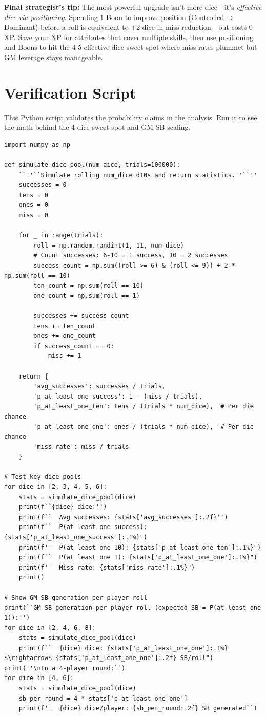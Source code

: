 \documentclass[11pt]{article}
\begin{document}
\textbf{Final strategist's tip:} 
The most powerful upgrade isn't more dice---it's \textit{effective dice via positioning}. Spending 1 Boon to improve position (Controlled$\rightarrow$Dominant) before a roll is equivalent to +2 dice in miss reduction---but costs 0 XP. Save your XP for attributes that cover multiple skills, then use positioning and Boons to hit the 4-5 effective dice sweet spot where miss rates plummet but GM leverage stays manageable.

\appendix
\section{Verification Script}
This Python script validates the probability claims in the analysis. Run it to see the math behind the 4-dice sweet spot and GM SB scaling.

\begin{lstlisting}
import numpy as np

def simulate_dice_pool(num_dice, trials=100000):
    ``''``Simulate rolling num_dice d10s and return statistics.''``''
    successes = 0
    tens = 0
    ones = 0
    miss = 0
    
    for _ in range(trials):
        roll = np.random.randint(1, 11, num_dice)
        # Count successes: 6-10 = 1 success, 10 = 2 successes
        success_count = np.sum((roll >= 6) & (roll <= 9)) + 2 * np.sum(roll == 10)
        ten_count = np.sum(roll == 10)
        one_count = np.sum(roll == 1)
        
        successes += success_count
        tens += ten_count
        ones += one_count
        if success_count == 0:
            miss += 1
    
    return {
        'avg_successes': successes / trials,
        'p_at_least_one_success': 1 - (miss / trials),
        'p_at_least_one_ten': tens / (trials * num_dice),  # Per die chance
        'p_at_least_one_one': ones / (trials * num_dice),  # Per die chance
        'miss_rate': miss / trials
    }

# Test key dice pools
for dice in [2, 3, 4, 5, 6]:
    stats = simulate_dice_pool(dice)
    print(f``{dice} dice:'')
    print(f``  Avg successes: {stats['avg_successes']:.2f}'')
    print(f``  P(at least one success): {stats['p_at_least_one_success']:.1%}")
    print(f''  P(at least one 10): {stats['p_at_least_one_ten']:.1%}")
    print(f``  P(at least one 1): {stats['p_at_least_one_one']:.1%}")
    print(f''  Miss rate: {stats['miss_rate']:.1%}")
    print()

# Show GM SB generation per player roll
print(``GM SB generation per player roll (expected SB = P(at least one 1)):'')
for dice in [2, 4, 6, 8]:
    stats = simulate_dice_pool(dice)
    print(f``  {dice} dice: {stats['p_at_least_one_one']:.1%} $\rightarrow$ {stats['p_at_least_one_one']:.2f} SB/roll")
print(''\nIn a 4-player round:``)
for dice in [4, 6]:
    stats = simulate_dice_pool(dice)
    sb_per_round = 4 * stats['p_at_least_one_one']
    print(f''  {dice} dice/player: {sb_per_round:.2f} SB generated``)
\end{lstlisting}
\end{document}
